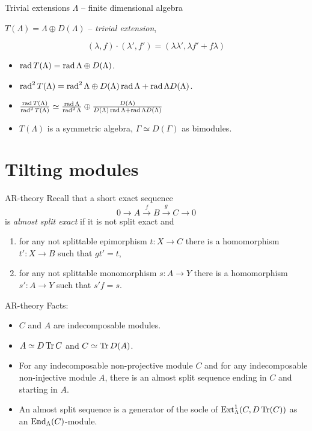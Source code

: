 \begin{frame}[fragile]{Trivial extensions}
$\Lambda$ -- finite dimensional algebra\medskip

$T(\Lambda) = \Lambda\oplus D(\Lambda)$ -- \emph{trivial extension},

\[ (\lambda, f)\cdot (\lambda',f') = (\lambda\lambda', \lambda f' +
f\lambda)\]

\begin{itemize}
\item $\operatorname{rad}\nolimits T(\Lambda) = \operatorname{rad}\nolimits\Lambda \oplus D(\Lambda)$. 
\item $\operatorname{rad}\nolimits^2 T(\Lambda) = \operatorname{rad}\nolimits^2\Lambda \oplus D(\Lambda)\operatorname{rad}\nolimits\Lambda
  + \operatorname{rad}\nolimits\Lambda D(\Lambda)$. 
\item $\frac{\operatorname{rad}\nolimits T(\Lambda)}{\operatorname{rad}\nolimits^2 T(\Lambda)} \simeq
\frac{\operatorname{rad}\nolimits\Lambda}{\operatorname{rad}\nolimits^2\Lambda}\oplus \frac{D(\Lambda)}{D(\Lambda)\operatorname{rad}\nolimits\Lambda
  + \operatorname{rad}\nolimits\Lambda D(\Lambda)}$
\item $T(\Lambda)$ is a symmetric algebra, $\Gamma\simeq D(\Gamma)$ as
bimodules.
\end{itemize} 
\end{frame}

\section{Tilting modules}

\begin{frame}[fragile]{AR-theory}
Recall that a short exact sequence 
\[0\to A\xrightarrow{f} B\xrightarrow{g} C\to 0\]
is \emph{almost split exact} if it is not split exact and 
\begin{enumerate}[\rm(i)]
\item for any not splittable epimorphism $t\colon X\to C$ there is a
  homomorphism $t'\colon X\to B$ such that $gt' = t$, 
\item for any not splittable monomorphism $s\colon A\to Y$ there is a
  homomorphism $s'\colon A\to Y$ such that $s'f = s$.
\end{enumerate}
\end{frame}

\begin{frame}[fragile]{AR-theory}
Facts:
\begin{itemize}
\item $C$ and $A$ are indecomposable modules. 
\item $A\simeq D\operatorname{Tr}\nolimits C$ and $C\simeq \operatorname{Tr}\nolimits D(A)$.  
\item For any indecomposable non-projective module $C$ and
for any indecomposable non-injective module $A$, there is an almost
split sequence ending in $C$ and starting in $A$.  
\item An almost split sequence is a generator of the socle of
  $\operatorname{Ext}\nolimits^1_\Lambda(C,D\operatorname{Tr}\nolimits(C))$ as an $\operatorname{End}\nolimits_\Lambda(C)$-module. 
\end{itemize}
\end{frame}

